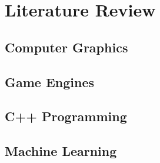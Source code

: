 \chapter{Literature Review}

\section{Computer Graphics}
\section{Game Engines}
\section{C++ Programming}
\section{Machine Learning}









